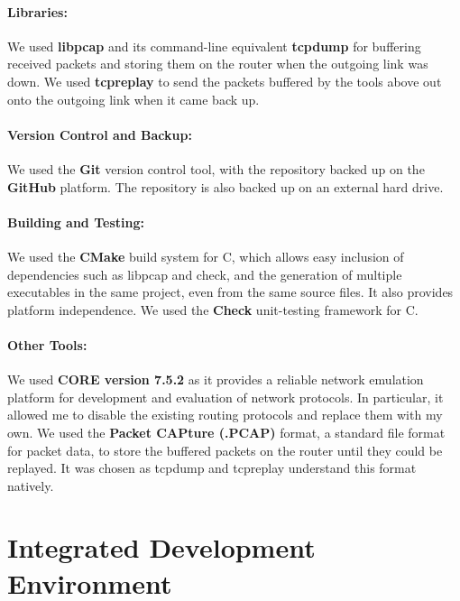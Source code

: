 \documentclass[withindex,glossary,openany]{cam-thesis}
\begin{document}
\paragraph{Libraries:}

We used \textbf{libpcap} and its command-line equivalent \textbf{tcpdump} \cite{TCPDUMP} for buffering received packets and storing them on the router when the outgoing link was down. We used \textbf{tcpreplay} \cite{TCPREPLAY} to send the packets buffered by the tools above out onto the outgoing link when it came back up.

\paragraph{Version Control and Backup:}

We used the \textbf{Git} version control tool, with the repository backed up on the \textbf{GitHub} platform. The repository is also backed up on an external hard drive.


\paragraph{Building and Testing:}

We used the \textbf{CMake} build system for C, which allows easy inclusion of dependencies such as libpcap and check, and the generation of multiple executables in the same project, even from the same source files. It also provides platform independence. We used the \textbf{Check} unit-testing framework for C.


\paragraph{Other Tools:}

We used \textbf{CORE version 7.5.2} as it provides a reliable network emulation platform for development and evaluation of network protocols. In particular, it allowed me to disable the existing routing protocols and replace them with my own. We used the \textbf{Packet CAPture (.PCAP)} format, a standard file format for packet data, to store the buffered packets on the router until they could be replayed. It was chosen as tcpdump and tcpreplay understand this format natively.

\section{Integrated Development Environment}
\end{document}
